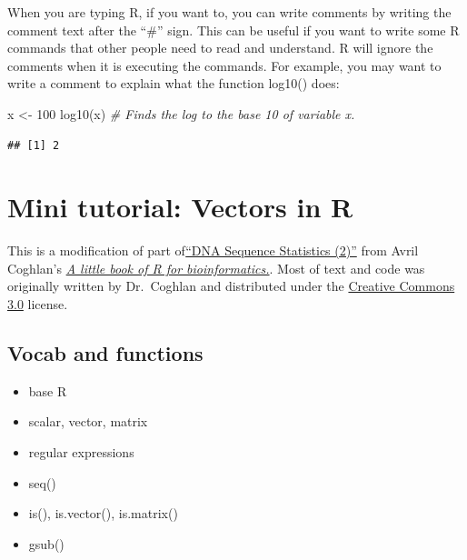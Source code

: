 \documentclass[
]{book}
\newenvironment{Shaded}{\begin{snugshade}}{\end{snugshade}}
\newcommand{\CommentTok}[1]{\textcolor[rgb]{0.56,0.35,0.01}{\textit{#1}}}
\newcommand{\DecValTok}[1]{\textcolor[rgb]{0.00,0.00,0.81}{#1}}
\newcommand{\FunctionTok}[1]{\textcolor[rgb]{0.00,0.00,0.00}{#1}}
\newcommand{\NormalTok}[1]{#1}
\newcommand{\OtherTok}[1]{\textcolor[rgb]{0.56,0.35,0.01}{#1}}
\providecommand{\tightlist}{%
  \setlength{\itemsep}{0pt}\setlength{\parskip}{0pt}}
\begin{document}
When you are typing R, if you want to, you can write comments by writing the comment text after the ``\#'' sign. This can be useful if you want to write some R commands that other people need to read and understand. R will ignore the comments when it is executing the commands. For example, you may want to write a comment to explain what the function log10() does:

\begin{Shaded}
\begin{Highlighting}[]
\NormalTok{x }\OtherTok{\textless{}{-}} \DecValTok{100}
\FunctionTok{log10}\NormalTok{(x) }\CommentTok{\# Finds the log to the base 10 of variable x.}
\end{Highlighting}
\end{Shaded}

\begin{verbatim}
## [1] 2
\end{verbatim}

\hypertarget{mini-tutorial-vectors-in-r}{%
\chapter{Mini tutorial: Vectors in R}\label{mini-tutorial-vectors-in-r}}

This is a modification of part of\href{https://a-little-book-of-r-for-bioinformatics.readthedocs.io/en/latest/src/chapter2.html}{``DNA Sequence Statistics (2)''} from Avril Coghlan's \href{https://a-little-book-of-r-for-bioinformatics.readthedocs.io/en/latest/index.html}{\emph{A little book of R for bioinformatics.}}. Most of text and code was originally written by Dr.~Coghlan and distributed under the \href{https://creativecommons.org/licenses/by/3.0/us/}{Creative Commons 3.0} license.

\hypertarget{vocab-and-functions}{%
\section{Vocab and functions}\label{vocab-and-functions}}

\begin{itemize}
\tightlist
\item
  base R
\item
  scalar, vector, matrix
\item
  regular expressions
\item
  seq()
\item
  is(), is.vector(), is.matrix()
\item
  gsub()
\end{itemize}
\end{document}
